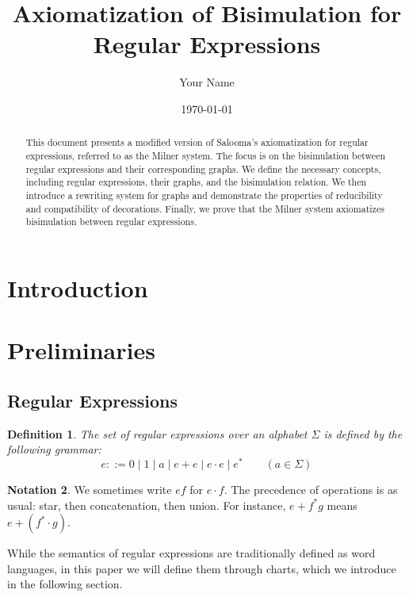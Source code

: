 \documentclass{article}
\newtheorem{definition}{Definition}[section]
\begin{document}
\title{Axiomatization of Bisimulation for Regular Expressions}
\author{Your Name}
\date{\today}
\maketitle  
\begin{abstract}
This document presents a modified version of Salooma's axiomatization for regular expressions, referred to as the Milner system. The focus is on the bisimulation between regular expressions and their corresponding graphs. We define the necessary concepts, including regular expressions, their graphs, and the bisimulation relation. We then introduce a rewriting system for graphs and demonstrate the properties of reducibility and compatibility of decorations. Finally, we prove that the Milner system axiomatizes bisimulation between regular expressions.

\end{abstract}
\section{Introduction}

\section{Preliminaries}

\subsection{Regular Expressions}
\begin{definition}
The set of \emph{regular expressions} over an alphabet $\Sigma$ is defined by the following grammar:
\[
e ::= 0 \mid 1 \mid a \mid e + e \mid e\cdot e \mid e^* \qquad (a \in \Sigma)
\]
\end{definition}

\vspace{1em}
\theoremstyle{definition}
\newtheorem{notation}[definition]{Notation}

\begin{notation}
We sometimes write $ef$ for $e \cdot f$. The precedence of operations is as usual: star, then concatenation, then union. For instance, $e+f^*g$ means $e+(f^*\cdot g)$.
\end{notation}
\vspace{1em}

While the semantics of regular expressions are traditionally defined as word languages, in this paper we will define them through charts, which we introduce in the following section.
\end{document}
